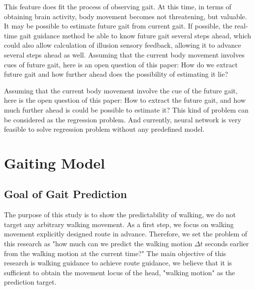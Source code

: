 \documentclass{sigchi}
\begin{document}
 This feature does fit the process of observing gait. At this time, in terms of obtaining brain activity, body movement becomes not threatening, but valuable. It may be possible to estimate future gait from current gait. If possible, the real-time gait guidance method be able to know future gait several steps ahead, which could also allow calculation of illusion sensory feedback, allowing it to advance several steps ahead as well. 
Assuming that the current body movement involves cues of future gait, here is an open question of this paper: How do we extract future gait and how further ahead does the possibility of estimating it lie?

Assuming that the current body movement involve the cue of the future gait, here is the open question of this paper: How to extract the future gait, and how much further ahead is could be possible to estimate it? This kind of problem can be considered as the regression problem. And currently, neural network\cite{LIU1999391} is very feasible to solve regression problem without any predefined model.






\section{Gaiting Model}

\subsection{Goal of Gait Prediction} %

The purpose of this study is to show the predictability of walking, we do not target any arbitrary walking movement. As a first step, we focus on walking movement explicitly designed route in advance. Therefore, we set the problem of this research as "how much can we predict the walking motion $\Delta t$ seconds earlier from the walking motion at the current time?" The main objective of this research is walking guidance to achieve route guidance, we believe that it is sufficient to obtain the movement locus of the head, "walking motion" as the prediction target.
\end{document}
